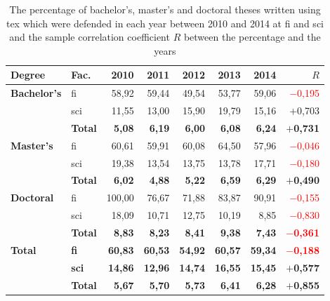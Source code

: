   \begin{table}
      \begin{tabularx}{\textwidth}{Xlrrrrrr}
      \textbf{Degree} & \textbf{Fac.} & \textbf{2010} & \textbf{2011} & \textbf{2012} & \textbf{2013} & \textbf{2014} & $R$\\
      \hline
      \textbf{Bachelor's}
        & \acrshort{fi}  & 58,92 & 59,44 & 49,54 & 53,77 & 59,06 & \textcolor{red}{$-$0,195} \\
        & \acrshort{sci} & 11,55 & 13,00 & 15,90 & 19,79 & 15,16 & \textcolor{OliveGreen}{$+$0,703} \\
        & \textbf{Total} & \textbf{5,08} & \textbf{6,19} & \textbf{6,00} & \textbf{6,08} & \textbf{6,24} & \textbf{\textcolor{OliveGreen}{$+$0,731}} \\
      \textbf{Master's}
        & \acrshort{fi}  & 60,61 & 59,91 & 60,08 & 64,50 & 57,96 & \textcolor{red}{$-$0,046} \\
        & \acrshort{sci} & 19,38 & 13,54 & 13,75 & 13,78 & 17,71 & \textcolor{red}{$-$0,180} \\
        & \textbf{Total} & \textbf{6,02} & \textbf{4,88} & \textbf{5,22} & \textbf{6,59} & \textbf{6,29} &  \textbf{\textcolor{OliveGreen}{$+$0,490}} \\
      \textbf{Doctoral}
        & \acrshort{fi}  & 100,00 & 76,67 & 71,88 & 83,87 & 90,91 & \textcolor{red}{$-$0,155} \\
        & \acrshort{sci} & 18,09  & 10,71 & 12,75 & 10,19 &  8,85 & \textcolor{red}{$-$0,830} \\
        & \textbf{Total} & \textbf{8,83} & \textbf{8,23} & \textbf{8,41} & \textbf{9,38} & \textbf{7,43} & \textcolor{red}{\textbf{$-$0,361}} \\
      \hline
      \textbf{Total} 
        & \textbf{\acrshort{fi} } & \textbf{60,83} & \textbf{60,53} & \textbf{54,92} & \textbf{60,57} & \textbf{59,34} & \textbf{\textcolor{red}{$-$0,188}} \\
        & \textbf{\acrshort{sci}} & \textbf{14,86} & \textbf{12,96} & \textbf{14,74} & \textbf{16,55} & \textbf{15,45} & \textbf{\textcolor{OliveGreen}{$+$0,577}} \\
        & \textbf{Total} &\textbf{5,67} & \textbf{5,70} & \textbf{5,73} & \textbf{6,41} & \textbf{6,28} & \textbf{\textcolor{OliveGreen}{$+$0,855}}
    \end{tabularx}
    \caption{The percentage of bachelor's, master's and doctoral theses written using \gls{tex} which were defended in each year between 2010 and 2014 at \acrshort{fi} and \acrshort{sci} and the sample correlation coefficient $R$ between the percentage and the years}
    \label{table:statistics-tex-yearly}
  \end{table}
  

